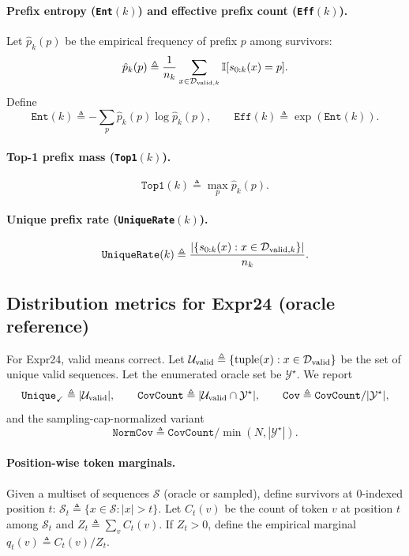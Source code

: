 \documentclass{article}
\theoremstyle{plain}
\theoremstyle{definition}
\theoremstyle{remark}
\begin{document}
\paragraph{Prefix entropy (\texttt{Ent}$(k)$) and effective prefix count (\texttt{Eff}$(k)$).}
Let $\hat p_k(p)$ be the empirical frequency of prefix $p$ among survivors:
\[
\hat p_k(p)\triangleq \frac{1}{n_k}\sum_{x\in\mathcal{D}_{\mathrm{valid},k}}\mathbb{I}[s_{0:k}(x)=p].
\]
Define
\[
\texttt{Ent}(k)\triangleq -\sum_p\hat p_k(p)\log \hat p_k(p),\qquad
\texttt{Eff}(k)\triangleq \exp(\texttt{Ent}(k)).
\]

\paragraph{Top-1 prefix mass (\texttt{Top1}$(k)$).}
\[
\texttt{Top1}(k)\triangleq \max_p\hat p_k(p).
\]

\paragraph{Unique prefix rate (\texttt{UniqueRate}$(k)$).}
\[
\texttt{UniqueRate}(k)\triangleq \frac{|\{s_{0:k}(x):x\in\mathcal{D}_{\mathrm{valid},k}\}|}{n_k}.
\]


\subsection{Distribution metrics for Expr24 (oracle reference)}
\label{app:metrics_expr24_dist}

For Expr24, valid means correct.
Let $\mathcal{U}_{\mathrm{valid}}\triangleq\{\mathrm{tuple}(x):x\in\mathcal{D}_{\mathrm{valid}}\}$ be the set of unique valid sequences.
Let the enumerated oracle set be $\mathcal{Y}^\star$.
We report
\[
\texttt{Unique}_{\checkmark}\triangleq |\mathcal{U}_{\mathrm{valid}}|,\qquad
\texttt{CovCount}\triangleq |\mathcal{U}_{\mathrm{valid}}\cap\mathcal{Y}^\star|,\qquad
\texttt{Cov}\triangleq \texttt{CovCount}/|\mathcal{Y}^\star|,
\]
and the sampling-cap-normalized variant
\[
\texttt{NormCov}\triangleq \texttt{CovCount}/\min(N,|\mathcal{Y}^\star|).
\]

\paragraph{Position-wise token marginals.}
Given a multiset of sequences $\mathcal{S}$ (oracle or sampled), define survivors at 0-indexed position $t$:
$\mathcal{S}_t\triangleq\{x\in\mathcal{S}:|x|>t\}$.
Let $C_t(v)$ be the count of token $v$ at position $t$ among $\mathcal{S}_t$ and $Z_t\triangleq\sum_v C_t(v)$.
If $Z_t>0$, define the empirical marginal $q_t(v)\triangleq C_t(v)/Z_t$.
\end{document}
